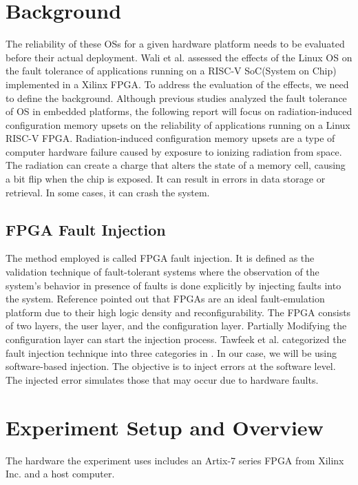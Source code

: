 \documentclass[conference]{IEEEtran}
\begin{document}
\section{Background}
The reliability of these OSs for a given hardware platform needs to be evaluated before their actual deployment.
Wali et al. \cite{b2} assessed the effects of the Linux OS on the fault tolerance of applications running on a RISC-V 
SoC(System on Chip) implemented in a Xilinx FPGA. To address the evaluation of the effects, we need to define the 
background. Although previous studies analyzed the fault tolerance of OS in embedded platforms, the following 
report will focus on radiation-induced configuration memory upsets on the reliability of applications running on 
a Linux RISC-V FPGA. Radiation-induced configuration memory upsets are a type of computer hardware failure caused 
by exposure to ionizing radiation from space. The radiation can create a charge that alters the state of a memory 
cell, causing a bit flip when the chip is exposed. It can result in errors in data storage or retrieval. In some
cases, it can crash the system. 
\subsection{FPGA Fault Injection} %
The method employed is called FPGA fault injection. It is defined as the validation technique of fault-tolerant 
systems where the observation of the system's behavior in presence of faults is done explicitly by 
injecting faults into the system. Reference \cite{b2} pointed out that FPGAs are an ideal fault-emulation platform 
due to their high logic density and reconfigurability. The FPGA consists of two layers, the user layer, and the configuration 
layer. Partially Modifying the configuration layer can start the injection process. Tawfeek et al. categorized the fault 
injection technique into three categories in \cite{b4}. In our case, we will be using software-based injection. 
The objective is to inject errors at the software level. The injected error simulates those that may occur due to hardware faults. 

\section{Experiment Setup and Overview}
The hardware the experiment uses includes an Artix-7 series FPGA from Xilinx Inc. and a host computer. 
\end{document}
